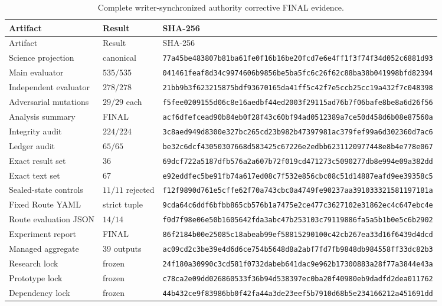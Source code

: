 {\scriptsize
\begin{longtable}{@{}L{3.2cm}L{2.3cm}L{8.5cm}@{}}
\caption{Complete writer-synchronized authority corrective FINAL evidence.}
\label{tab:authority-ledger}\\
\toprule
Artifact & Result & SHA-256 \\
\midrule
\endfirsthead
\toprule
Artifact & Result & SHA-256 \\
\midrule
\endhead
Science projection & canonical & \nolinkurl{77a45be483807b81ba61fe0f16b16be20fcd7e6e4ff1f3f74f34d052c6881d93} \\
Main evaluator & $535/535$ & \nolinkurl{041461feaf8d34c9974606b9856be5ba5fc6c26f62c88ba38b041998bfd82394} \\
Independent evaluator & $278/278$ & \nolinkurl{21bb9b3f623215875bdf93670165da41ff5c42f7e5ccb25cc19a432f7c048398} \\
Adversarial mutations & $29/29$ each & \nolinkurl{f5fee0209155d06c8e16aedbf44ed2003f29115ad76b7f06bafe8be8a6d26f56} \\
Analysis summary & FINAL & \nolinkurl{acf6dfefcead90b84eb0f28f43c60bf94ad0512389a7ce50d458d6b08e87560a} \\
Integrity audit & $224/224$ & \nolinkurl{3c8aed949d8300e327bc265cd23b982b47397981ac379fef99a6d302360d7ac6} \\
Ledger audit & $65/65$ & \nolinkurl{be32c6dcf43050307668d583425c67226e2edbb6231120977448e8b4e778e067} \\
Exact result set & 36 & \nolinkurl{69dcf722a5187dfb576a2a607b72f019cd471273c5090277db8e994e09a382dd} \\
Exact text set & 67 & \nolinkurl{e92eddfec5be91fb74a617ed08c7f532e856cbc08c51d14887eafd9ee39358c5} \\
Sealed-state controls & $11/11$ rejected & \nolinkurl{f12f9890d761e5cffe62f70a743cbc0a4749fe90237aa391033321581197181a} \\
Fixed Route YAML & strict tuple & \nolinkurl{9cda64c6ddf6bfbb865cb576b1a7475e2ce477c3627102e31862ec4c647ebc4e} \\
Route evaluation JSON & $14/14$ & \nolinkurl{f0d7f98e06e50b1605642fda3abc47b253103c79119886fa5a5b1b0e5c6b2902} \\
Experiment report & FINAL & \nolinkurl{86f2184b00e25085c18abeab99ef58815290100c42cb267ea33d16f6439d4dcd} \\
Managed aggregate & 39 outputs & \nolinkurl{ac09cd2c3be39e4d6d6ce754b5648d8a2abf7fd7fb9848db984558ff33dc82b3} \\
Research lock & frozen & \nolinkurl{24f180a30990c3cd581f0732dabeb641dac9e962b17300883a28f77a3844e43a} \\
Prototype lock & frozen & \nolinkurl{c78ca2e09dd026860533f36b94d538397ec0ba20f40980eb9dadfd2dea011762} \\
Dependency lock & frozen & \nolinkurl{44b432ce9f83986bb0f42fa44a3de23eef5b7910d68b5e234166212a451691dd} \\
\bottomrule
\end{longtable}
}

